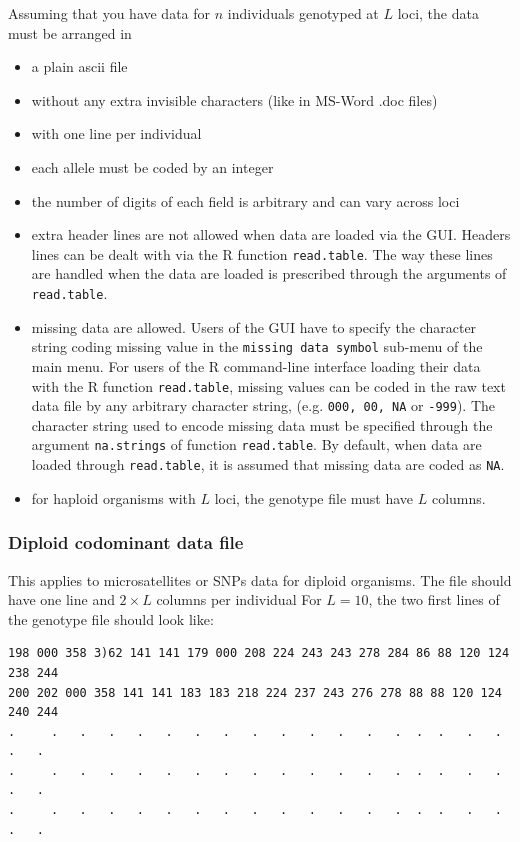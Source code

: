 \documentclass[a4paper,10pt]{article}
\begin{document}
Assuming that you have data for $n$  individuals  genotyped at $L$ loci, 
the data must be arranged in 
\begin{itemize}
\item a plain ascii file 
\item without any extra invisible characters (like in MS-Word .doc files)
\item with one line per individual
\item each allele must be coded by an integer
\item the number of digits of each field is arbitrary and can vary across loci
\item extra header lines are not allowed when data are loaded via the GUI. 
Headers lines can be dealt with via the R function \texttt{read.table}. 
 The way these lines are handled when the data are loaded is prescribed 
through the arguments of \texttt{read.table}.
\item missing data  are allowed. 
Users of the GUI have to specify the character string coding missing value in the \texttt{missing data symbol} sub-menu 
of the main menu. 
For users of the R command-line interface loading their data with the R function \texttt{read.table}, 
missing values can be coded in the raw text data file by any arbitrary character string, 
(e.g. {\tt000, 00, NA} or {\tt -999}). 
The character string used to encode missing data must be specified through the argument \texttt{na.strings} 
of function \texttt{read.table}. By default, when data are loaded through \texttt{read.table}, 
it is assumed that missing data 
are coded as {\tt NA}.
\item for haploid organisms with $L$ loci, the genotype file must have $L$ columns.
\end{itemize}

\subsubsection{Diploid codominant data file}

This applies to microsatellites or SNPs data for diploid organisms.
The file should have one line and $2\times L$ columns per individual
For $L=10$, the two first lines of the genotype file should look like:\\

\medskip
\begin{verbatim}
198 000 358 3)62 141 141 179 000 208 224 243 243 278 284 86 88 120 124 238 244
200 202 000 358 141 141 183 183 218 224 237 243 276 278 88 88 120 124 240 244
.     .   .   .   .   .   .   .   .   .   .   .   .   .  .  .   .   .   .   .
.     .   .   .   .   .   .   .   .   .   .   .   .   .  .  .   .   .   .   .
.     .   .   .   .   .   .   .   .   .   .   .   .   .  .  .   .   .   .   .
\end{verbatim}
\end{document}
